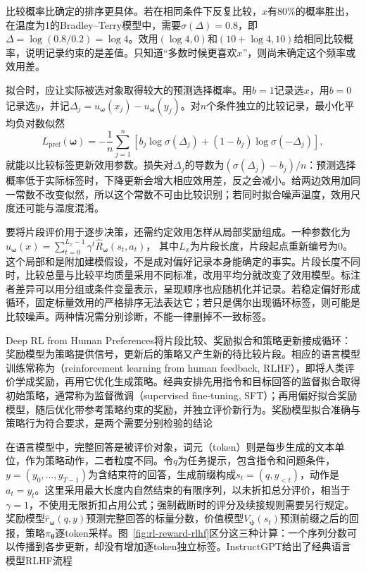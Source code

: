 比较概率比确定的排序更具体。若在相同条件下反复比较，$x$有$80\%$的概率胜出，在温度为1的Bradley--Terry模型中，需要$\sigma(\Delta)=0.8$，即$\Delta=\log(0.8/0.2)=\log4$。效用$(\log4,0)$和$(10+\log4,10)$给相同比较概率，说明记录约束的是差值。只知道“多数时候更喜欢$x$”，则尚未确定这个频率或效用差。

拟合时，应让实际被选对象取得较大的预测选择概率。用$b=1$记录选$x$，用$b=0$记录选$y$，并记$\Delta_j=u_{\bm{\omega}}(x_j)-u_{\bm{\omega}}(y_j)$。对$n$个条件独立的比较记录，最小化平均负对数似然
\begin{equation}
  L_{\mathrm{pref}}(\bm{\omega})
  =-\frac1n\sum_{j=1}^n
    \left[b_j\log\sigma(\Delta_j)
      +(1-b_j)\log\sigma(-\Delta_j)\right],
  \label{eq:rl-reward-bt-loss}
\end{equation}
就能以比较标签更新效用参数。损失对$\Delta_j$的导数为$(\sigma(\Delta_j)-b_j)/n$：预测选择概率低于实际标签时，下降更新会增大相应效用差，反之会减小。给两边效用加同一常数不改变似然，所以这个常数不可由比较识别；若同时拟合噪声温度，效用尺度还可能与温度混淆。

要将片段评价用于逐步决策，还需约定效用怎样从局部奖励组成。一种参数化为
$u_{\bm{\omega}}(x)=\sum_{t=0}^{L_x-1}\gamma^t
\widehat R_{\bm{\omega}}(s_t,a_t)$，
其中$L_x$为片段长度，片段起点重新编号为0。这个局部和是附加建模假设，不是成对偏好记录本身能确定的事实。片段长度不同时，比较总量与比较平均质量采用不同标准，改用平均分就改变了效用模型。标注者差异可以用分组或条件变量表示，呈现顺序也应随机化并记录。若稳定偏好形成循环，固定标量效用的严格排序无法表达它；若只是偶尔出现循环标签，则可能是比较噪声。两种情况需分别诊断，不能一律删掉不一致标签。

Deep RL from Human Preferences将片段比较、奖励拟合和策略更新接成循环：奖励模型为策略提供信号，更新后的策略又产生新的待比较片段。相应的语言模型训练常称为（reinforcement learning from human feedback, RLHF），即将人类评价学成奖励，再用它优化生成策略。经典安排先用指令和目标回答的监督拟合取得初始策略，通常称为监督微调（supervised fine-tuning, SFT）；再用偏好拟合奖励模型，随后优化带参考策略约束的奖励，并独立评价新行为。奖励模型拟合准确与策略行为符合要求，是两个需要分别检验的结论

在语言模型中，完整回答是被评价对象，词元（token）则是每步生成的文本单位，作为策略动作，二者粒度不同。令$q$为任务提示，包含指令和问题条件，$y=(y_0,\ldots,y_{T-1})$为含结束符的回答，生成前缀构成$s_t=(q,y_{<t})$，动作是$a_t=y_t$。这里采用最大长度内自然结束的有限序列，以未折扣总分评价，相当于$\gamma=1$，不使用无限折扣占用公式；强制截断时的评分及续接规则需要另行规定。奖励模型$\widehat r_{\bm{\omega}}(q,y)$预测完整回答的标量分数，价值模型$V_{\bm{\psi}}(s_t)$预测前缀之后的回报，策略$\pi_{\bm{\theta}}$逐token采样。图~\ref{fig:rl-reward-rlhf}区分这三种计算：一个序列分数可以传播到各步更新，却没有增加逐token独立标签。InstructGPT给出了经典语言模型RLHF流程

